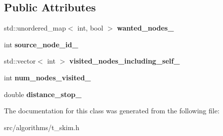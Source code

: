 \subsection*{Public Attributes}
\begin{DoxyCompactItemize}
\item 
\hypertarget{classall__distance__sketch_1_1TSkimDijkstraCallBacksDistancePrune_a818d8d8095dba88dc5c325a67bc3eb74}{}std\+::unordered\+\_\+map$<$ int, bool $>$ {\bfseries wanted\+\_\+nodes\+\_\+}\label{classall__distance__sketch_1_1TSkimDijkstraCallBacksDistancePrune_a818d8d8095dba88dc5c325a67bc3eb74}

\item 
\hypertarget{classall__distance__sketch_1_1TSkimDijkstraCallBacksDistancePrune_ac8a5b78c2d0a21750522479476daf3d1}{}int {\bfseries source\+\_\+node\+\_\+id\+\_\+}\label{classall__distance__sketch_1_1TSkimDijkstraCallBacksDistancePrune_ac8a5b78c2d0a21750522479476daf3d1}

\item 
\hypertarget{classall__distance__sketch_1_1TSkimDijkstraCallBacksDistancePrune_a8333d299b5fcbb5146c79d13a8df2a48}{}std\+::vector$<$ int $>$ {\bfseries visited\+\_\+nodes\+\_\+including\+\_\+self\+\_\+}\label{classall__distance__sketch_1_1TSkimDijkstraCallBacksDistancePrune_a8333d299b5fcbb5146c79d13a8df2a48}

\item 
\hypertarget{classall__distance__sketch_1_1TSkimDijkstraCallBacksDistancePrune_a1f84d231b92aba8f3727de3cad782b17}{}int {\bfseries num\+\_\+nodes\+\_\+visited\+\_\+}\label{classall__distance__sketch_1_1TSkimDijkstraCallBacksDistancePrune_a1f84d231b92aba8f3727de3cad782b17}

\item 
\hypertarget{classall__distance__sketch_1_1TSkimDijkstraCallBacksDistancePrune_a878ec07ca1d8f42bee8901a62f8be572}{}double {\bfseries distance\+\_\+stop\+\_\+}\label{classall__distance__sketch_1_1TSkimDijkstraCallBacksDistancePrune_a878ec07ca1d8f42bee8901a62f8be572}

\end{DoxyCompactItemize}


The documentation for this class was generated from the following file\+:\begin{DoxyCompactItemize}
\item 
src/algorithms/t\+\_\+skim.\+h\end{DoxyCompactItemize}
